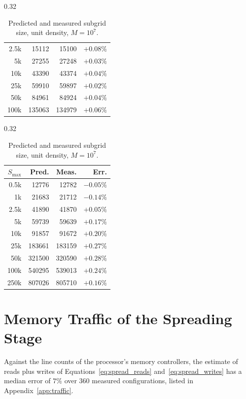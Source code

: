 \begin{table}[ht]
\begin{subtable}[t]{0.32\textwidth}
\begin{tabular}{rrrr}
            2.5k   & 15112  & 15100  & $+0.08\%$ \\
            5k     & 27255  & 27248  & $+0.03\%$ \\
            10k    & 43390  & 43374  & $+0.04\%$ \\
            25k    & 59910  & 59897  & $+0.02\%$ \\
            50k    & 84961  & 84924  & $+0.04\%$ \\
            100k   & 135063 & 134979 & $+0.06\%$ \\
            \hline
        \end{tabular}
        \caption{2D, $N_x = N_y = 3162$.}
        \label{tab:subgrid_2d}
    \end{subtable}
    \hfill
    \begin{subtable}[t]{0.32\textwidth}
        \centering
        \begin{tabular}{rrrr}
            \hline
            $S_{\max}$ & Pred. & Meas. & Err. \\
            \hline
            0.5k   & 12776  & 12782  & $-0.05\%$ \\
            1k     & 21683  & 21712  & $-0.14\%$ \\
            2.5k   & 41890  & 41870  & $+0.05\%$ \\
            5k     & 59739  & 59639  & $+0.17\%$ \\
            10k    & 91857  & 91672  & $+0.20\%$ \\
            25k    & 183661 & 183159 & $+0.27\%$ \\
            50k    & 321500 & 320590 & $+0.28\%$ \\
            100k   & 540295 & 539013 & $+0.24\%$ \\
            250k   & 807026 & 805710 & $+0.16\%$ \\
            \hline
        \end{tabular}
        \caption{3D, $N_x = N_y = N_z = 215$.}
        \label{tab:subgrid_3d}
    \end{subtable}
    \caption{Predicted and measured subgrid size, unit density, $M = 10^7$.}
    \label{tab:subgrid_pred}
\end{table}

\section{Memory Traffic of the Spreading Stage}
\label{sec:eval_traffic}

Against the line counts of the processor's memory controllers, the estimate of reads plus writes of Equations~\eqref{eq:spread_reads} and~\eqref{eq:spread_writes} has a median error of $7\%$ over $360$ measured configurations, listed in Appendix~\ref{app:traffic}.

